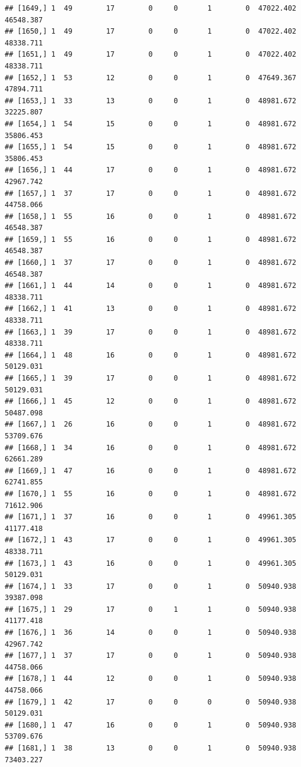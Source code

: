 \documentclass[
]{article}
\begin{document}
\begin{verbatim}
## [1649,] 1  49        17        0     0       1        0  47022.402  46548.387
## [1650,] 1  49        17        0     0       1        0  47022.402  48338.711
## [1651,] 1  49        17        0     0       1        0  47022.402  48338.711
## [1652,] 1  53        12        0     0       1        0  47649.367  47894.711
## [1653,] 1  33        13        0     0       1        0  48981.672  32225.807
## [1654,] 1  54        15        0     0       1        0  48981.672  35806.453
## [1655,] 1  54        15        0     0       1        0  48981.672  35806.453
## [1656,] 1  44        17        0     0       1        0  48981.672  42967.742
## [1657,] 1  37        17        0     0       1        0  48981.672  44758.066
## [1658,] 1  55        16        0     0       1        0  48981.672  46548.387
## [1659,] 1  55        16        0     0       1        0  48981.672  46548.387
## [1660,] 1  37        17        0     0       1        0  48981.672  46548.387
## [1661,] 1  44        14        0     0       1        0  48981.672  48338.711
## [1662,] 1  41        13        0     0       1        0  48981.672  48338.711
## [1663,] 1  39        17        0     0       1        0  48981.672  48338.711
## [1664,] 1  48        16        0     0       1        0  48981.672  50129.031
## [1665,] 1  39        17        0     0       1        0  48981.672  50129.031
## [1666,] 1  45        12        0     0       1        0  48981.672  50487.098
## [1667,] 1  26        16        0     0       1        0  48981.672  53709.676
## [1668,] 1  34        16        0     0       1        0  48981.672  62661.289
## [1669,] 1  47        16        0     0       1        0  48981.672  62741.855
## [1670,] 1  55        16        0     0       1        0  48981.672  71612.906
## [1671,] 1  37        16        0     0       1        0  49961.305  41177.418
## [1672,] 1  43        17        0     0       1        0  49961.305  48338.711
## [1673,] 1  43        16        0     0       1        0  49961.305  50129.031
## [1674,] 1  33        17        0     0       1        0  50940.938  39387.098
## [1675,] 1  29        17        0     1       1        0  50940.938  41177.418
## [1676,] 1  36        14        0     0       1        0  50940.938  42967.742
## [1677,] 1  37        17        0     0       1        0  50940.938  44758.066
## [1678,] 1  44        12        0     0       1        0  50940.938  44758.066
## [1679,] 1  42        17        0     0       0        0  50940.938  50129.031
## [1680,] 1  47        16        0     0       1        0  50940.938  53709.676
## [1681,] 1  38        13        0     0       1        0  50940.938  73403.227

\end{verbatim}
\end{document}
